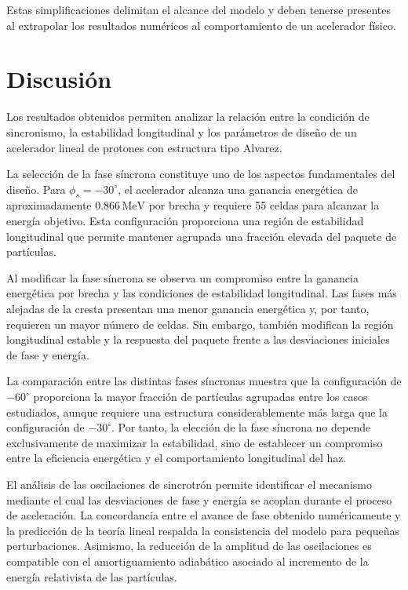 Estas simplificaciones delimitan el alcance del modelo y deben tenerse presentes al extrapolar los resultados numéricos al comportamiento de un acelerador físico.

\section{Discusión}

Los resultados obtenidos permiten analizar la relación entre la condición de sincronismo, la estabilidad longitudinal y los parámetros de diseño de un acelerador lineal de protones con estructura tipo Alvarez.

La selección de la fase síncrona constituye uno de los aspectos fundamentales del diseño. Para $\phi_s=-30^\circ$, el acelerador alcanza una ganancia energética de aproximadamente $0.866\,\mathrm{MeV}$ por brecha y requiere 55 celdas para alcanzar la energía objetivo. Esta configuración proporciona una región de estabilidad longitudinal que permite mantener agrupada una fracción elevada del paquete de partículas.

Al modificar la fase síncrona se observa un compromiso entre la ganancia energética por brecha y las condiciones de estabilidad longitudinal. Las fases más alejadas de la cresta presentan una menor ganancia energética y, por tanto, requieren un mayor número de celdas. Sin embargo, también modifican la región longitudinal estable y la respuesta del paquete frente a las desviaciones iniciales de fase y energía.

La comparación entre las distintas fases síncronas muestra que la configuración de $-60^\circ$ proporciona la mayor fracción de partículas agrupadas entre los casos estudiados, aunque requiere una estructura considerablemente más larga que la configuración de $-30^\circ$. Por tanto, la elección de la fase síncrona no depende exclusivamente de maximizar la estabilidad, sino de establecer un compromiso entre la eficiencia energética y el comportamiento longitudinal del haz.

El análisis de las oscilaciones de sincrotrón permite identificar el mecanismo mediante el cual las desviaciones de fase y energía se acoplan durante el proceso de aceleración. La concordancia entre el avance de fase obtenido numéricamente y la predicción de la teoría lineal respalda la consistencia del modelo para pequeñas perturbaciones. Asimismo, la reducción de la amplitud de las oscilaciones es compatible con el amortiguamiento adiabático asociado al incremento de la energía relativista de las partículas.


